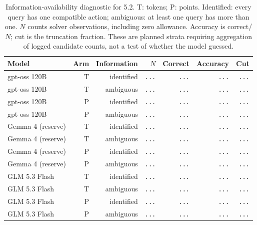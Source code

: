 \begin{table}[H]
\centering\footnotesize
\setlength{\tabcolsep}{4pt}
\caption{Information-availability diagnostic for 5.2. T: tokens; P: points. Identified: every query has one compatible action; ambiguous: at least one query has more than one. $N$ counts solver observations, including zero allowance. Accuracy is correct/$N$; cut is the truncation fraction. These are planned strata requiring aggregation of logged candidate counts, not a test of whether the model guessed.}
\label{tab:information-results}
\begin{tabular}{@{}lrrrrrr@{}}
\toprule
Model & Arm & Information & $N$ & Correct & Accuracy & Cut \\
\midrule
gpt-oss 120B & T & identified & {\color{gray}\texttt{...}} & {\color{gray}\texttt{...}} & {\color{gray}\texttt{...}} & {\color{gray}\texttt{...}} \\
gpt-oss 120B & T & ambiguous & {\color{gray}\texttt{...}} & {\color{gray}\texttt{...}} & {\color{gray}\texttt{...}} & {\color{gray}\texttt{...}} \\
gpt-oss 120B & P & identified & {\color{gray}\texttt{...}} & {\color{gray}\texttt{...}} & {\color{gray}\texttt{...}} & {\color{gray}\texttt{...}} \\
gpt-oss 120B & P & ambiguous & {\color{gray}\texttt{...}} & {\color{gray}\texttt{...}} & {\color{gray}\texttt{...}} & {\color{gray}\texttt{...}} \\
Gemma 4 (reserve) & T & identified & {\color{gray}\texttt{...}} & {\color{gray}\texttt{...}} & {\color{gray}\texttt{...}} & {\color{gray}\texttt{...}} \\
Gemma 4 (reserve) & T & ambiguous & {\color{gray}\texttt{...}} & {\color{gray}\texttt{...}} & {\color{gray}\texttt{...}} & {\color{gray}\texttt{...}} \\
Gemma 4 (reserve) & P & identified & {\color{gray}\texttt{...}} & {\color{gray}\texttt{...}} & {\color{gray}\texttt{...}} & {\color{gray}\texttt{...}} \\
Gemma 4 (reserve) & P & ambiguous & {\color{gray}\texttt{...}} & {\color{gray}\texttt{...}} & {\color{gray}\texttt{...}} & {\color{gray}\texttt{...}} \\
GLM 5.3 Flash & T & identified & {\color{gray}\texttt{...}} & {\color{gray}\texttt{...}} & {\color{gray}\texttt{...}} & {\color{gray}\texttt{...}} \\
GLM 5.3 Flash & T & ambiguous & {\color{gray}\texttt{...}} & {\color{gray}\texttt{...}} & {\color{gray}\texttt{...}} & {\color{gray}\texttt{...}} \\
GLM 5.3 Flash & P & identified & {\color{gray}\texttt{...}} & {\color{gray}\texttt{...}} & {\color{gray}\texttt{...}} & {\color{gray}\texttt{...}} \\
GLM 5.3 Flash & P & ambiguous & {\color{gray}\texttt{...}} & {\color{gray}\texttt{...}} & {\color{gray}\texttt{...}} & {\color{gray}\texttt{...}} \\
\bottomrule
\end{tabular}
\end{table}
